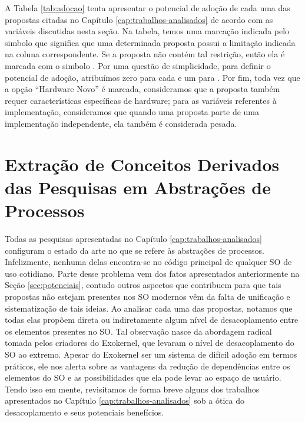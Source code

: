 A Tabela \ref{tab:adocao} tenta apresentar o potencial de adoção de cada uma
das propostas citadas no Capítulo \ref{cap:trabalhos-analisados} de acordo com
as variáveis discutidas nesta seção. Na tabela, temos uma marcação indicada
pelo simbolo  que significa que uma determinada proposta possui a
limitação indicada na coluna correspondente. Se a proposta não contém tal restrição, então ela
é marcada com o simbolo . Por uma questão de simplicidade, para
definir o potencial de adoção, atribuímos zero para cada  e um para
. Por fim, toda vez que a opção ``Hardware Novo'' é marcada,
consideramos que a proposta também requer características específicas de
hardware; para as variáveis referentes à implementação, consideramos que quando
uma proposta parte de uma implementação independente, ela também é considerada
pesada.



\section{Extração de Conceitos Derivados das Pesquisas em Abstrações de Processos}
\label{sec:extracao}

Todas as pesquisas apresentadas no Capítulo \ref{cap:trabalhos-analisados}
configuram o estado da arte no que se refere às abstrações de processos.
Infelizmente, nenhuma delas encontra-se no código principal de qualquer SO de
uso cotidiano. Parte desse problema vem dos fatos apresentados anteriormente na Seção
\ref{sec:potenciais}, contudo outros aspectos que contribuem para que tais
propostas não estejam presentes nos SO modernos vêm da falta de unificação e
sistematização de tais ideias. Ao analisar cada uma das propostas, notamos que
todas elas propõem direta ou indiretamente algum nível de desacoplamento entre
os elementos presentes no SO. Tal observação nasce da abordagem radical tomada
pelos criadores do Exokernel, que levaram o nível de desacoplamento do SO ao
extremo. Apesar do Exokernel ser um sistema de difícil adoção em termos
práticos, ele nos alerta sobre as vantagens da redução de dependências
entre os elementos do SO e as possibilidades que ela pode levar ao espaço de
usuário. Tendo isso em mente, revisitamos de forma breve alguns dos trabalhos
apresentados no Capítulo \ref{cap:trabalhos-analisados} sob a ótica do
desacoplamento e seus potenciais benefícios.

